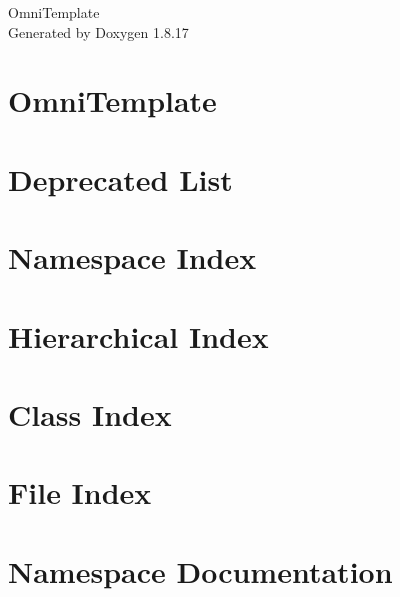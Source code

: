 \let\mypdfximage\pdfximage\def\pdfximage{\immediate\mypdfximage}\documentclass[twoside]{book}
\newcommand{\+}{\discretionary{\mbox{\scriptsize$\hookleftarrow$}}{}{}}
\newcommand{\clearemptydoublepage}{%
  \newpage{\pagestyle{empty}\cleardoublepage}%
}
\begin{document}
\hypersetup{pageanchor=false,
             bookmarksnumbered=true,
             pdfencoding=unicode
            }
\begin{titlepage}
\vspace*{7cm}
\begin{center}%
{\Large Omni\+Template }\\
\vspace*{1cm}
{\large Generated by Doxygen 1.8.17}\\
\end{center}
\end{titlepage}
\clearemptydoublepage
{}
\tableofcontents
\clearemptydoublepage
{}
\hypersetup{pageanchor=true}

\chapter{Omni\+Template}
\label{md__home_ram_OmniTemplate_README}

\chapter{Deprecated List}
\label{deprecated}

\chapter{Namespace Index}

\chapter{Hierarchical Index}

\chapter{Class Index}

\chapter{File Index}

\chapter{Namespace Documentation}


















\end{document}
